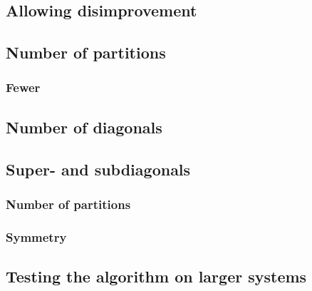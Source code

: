 \subsection{Allowing disimprovement}


\subsection{Number of partitions}\label{sec: num par}


\subsubsection{Fewer}


\subsection{Number of diagonals}\label{sec: num super}

\newpage
\subsection{Super- and subdiagonals}\label{sec: super sub}


\subsubsection{Number of partitions}


\subsubsection{Symmetry}


\subsection{Testing the algorithm on larger systems}
